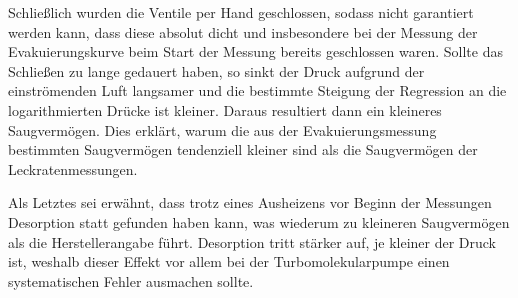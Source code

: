 Schließlich wurden die Ventile per Hand geschlossen, sodass nicht garantiert
werden kann, dass diese absolut dicht und insbesondere bei der
Messung der Evakuierungskurve beim Start der Messung bereits geschlossen waren.
Sollte das Schließen zu lange gedauert haben, so sinkt der Druck aufgrund der
einströmenden Luft langsamer und die bestimmte Steigung der Regression an die
logarithmierten Drücke ist kleiner.
Daraus resultiert dann ein kleineres Saugvermögen. Dies erklärt, warum die
aus der Evakuierungsmessung bestimmten Saugvermögen tendenziell kleiner sind
als die Saugvermögen der Leckratenmessungen.

Als Letztes sei erwähnt, dass trotz eines Ausheizens vor Beginn der Messungen
Desorption statt gefunden haben kann, was wiederum zu kleineren Saugvermögen
als die Herstellerangabe führt. Desorption tritt stärker auf, je kleiner der
Druck ist, weshalb dieser Effekt vor allem bei der Turbomolekularpumpe einen
systematischen Fehler ausmachen sollte.

